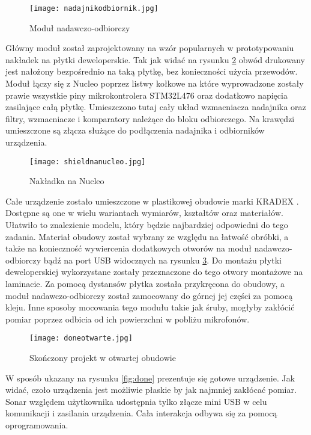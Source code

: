 \begin{figure}[ht!]
    \centering
    \texttt{[image: nadajnikodbiornik.jpg]}
    \caption{Moduł nadawczo-odbiorczy}
    \label{fig:nadajnikodbiornik}
\end{figure}

Główny moduł został zaprojektowany na wzór popularnych w prototypowaniu nakładek na płytki deweloperskie. 
Tak jak widać na rysunku \ref{fig:shieldnucleo} obwód drukowany jest nałożony bezpośrednio na taką płytkę, bez konieczności użycia przewodów.  
Moduł łączy się z Nucleo poprzez listwy kołkowe na które wyprowadzone zostały prawie wszystkie piny mikrokontrolera STM32L476 oraz dodatkowo napięcia zasilające całą płytkę.
Umieszczono tutaj cały układ wzmacniacza nadajnika oraz filtry, wzmacniacze i komparatory należące do bloku odbiorczego. 
Na krawędzi umieszczone są złącza służące do podłączenia nadajnika i odbiorników urządzenia.

\begin{figure}[ht!]
    \centering
    \texttt{[image: shieldnanucleo.jpg]}
    \caption{Nakładka na Nucleo}
    \label{fig:shieldnucleo}
\end{figure}

\clearpage
Całe urządzenie zostało umieszczone w plastikowej obudowie marki KRADEX \cite{kradex}. Dostępne są one w wielu wariantach wymiarów, 
kształtów oraz materiałów. Ułatwiło to znalezienie modelu, który będzie najbardziej odpowiedni do tego zadania. Materiał obudowy został wybrany ze względu na łatwość obróbki, 
a także na konieczność wywiercenia dodatkowych otworów na moduł nadawczo-odbiorczy bądź na port USB widocznych na rysunku \ref{fig:done_open}.
Do montażu płytki deweloperskiej wykorzystane zostały przeznaczone do tego otwory montażowe na laminacie. Za pomocą dystansów płytka została przykręcona do obudowy, 
a moduł nadawczo-odbiorczy został zamocowany do górnej jej części za pomocą kleju. 
Inne sposoby mocowania tego modułu takie jak śruby, mogłyby zakłócić pomiar poprzez odbicia od ich powierzchni w pobliżu mikrofonów. 

\begin{figure}[ht!]
    \centering
    \texttt{[image: doneotwarte.jpg]}
    \caption{Skończony projekt w otwartej obudowie}
    \label{fig:done_open}
\end{figure}

W sposób ukazany na rysunku \ref{fig:done} prezentuje się gotowe urządzenie. Jak widać, czoło urządzenia jest możliwie płaskie by jak najmniej zakłócać pomiar.
Sonar względem użytkownika udostępnia tylko złącze mini USB w celu komunikacji i zasilania urządzenia. Cała interakcja odbywa się za pomocą oprogramowania.

